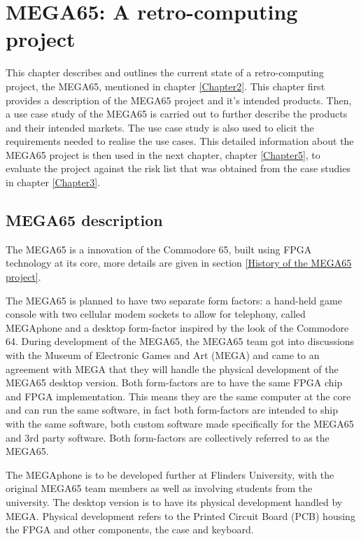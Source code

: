 
\chapter{MEGA65: A retro-computing project}
\label{Chapter4}

This chapter describes and outlines the current state of a retro-computing project, the MEGA65, mentioned in chapter \ref{Chapter2}. This chapter first provides a description of the MEGA65 project and it's intended products. Then, a use case study of the MEGA65 is carried out to further describe the products and their intended markets. The use case study is also used to elicit the requirements needed to realise the use cases. This detailed information about the MEGA65 project is then used in the next chapter, chapter \ref{Chapter5}, to evaluate the project against the risk list that was obtained from the case studies in chapter \ref{Chapter3}.
\section{MEGA65 description}
The MEGA65 is a innovation of the Commodore 65, built using FPGA technology at its core, more details are given in section \ref{History of the MEGA65 project}. 

The MEGA65 is planned to have two separate form factors: a hand-held game console with two cellular modem sockets to allow for telephony, called MEGAphone and a desktop form-factor inspired by the look of the Commodore 64. During development of the MEGA65, the MEGA65 team got into discussions with the Museum of Electronic Games and Art (MEGA) and came to an agreement with MEGA that they will handle the physical development of the MEGA65 desktop version. Both form-factors are to have the same FPGA chip and FPGA implementation. This means they are the same computer at the core and can run the same software, in fact both form-factors are intended to ship with the same software, both custom software made specifically for the MEGA65 and 3rd party software. Both form-factors are collectively referred to as the MEGA65. 

The MEGAphone is to be developed further at Flinders University, with the original MEGA65 team members as well as involving students from the university. The desktop version is to have its physical development handled by MEGA. Physical development refers to the Printed Circuit Board (PCB) housing the FPGA and other components, the case and keyboard. 

